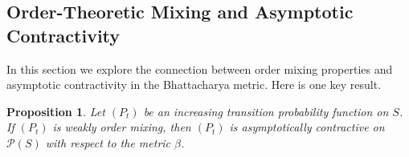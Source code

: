 \documentclass[12pt,reqno]{amsart}
\numberwithin{equation}{section}
\newtheorem{proposition}{Proposition}[section]
\theoremstyle{definition}
\newcommand{\1}{\mathbbm{1}}
\newcommand{\PP}{\mathbb P}
\newcommand{\EE}{\mathbb E}
\newcommand{\pP}{\mathscr{P}}
\begin{document}
%

\subsection{Order-Theoretic Mixing and Asymptotic Contractivity}

In this section we explore the connection between order mixing 
properties and asymptotic contractivity in the Bhattacharya metric.
Here is one key result.

\begin{proposition}\label{p:orwomnew}
    Let $(P_t)$ be an increasing transition probability function on $S$.
    If $(P_t)$ is weakly order mixing, then $(P_t)$ is
    asymptotically contractive on $\pP(S)$ with respect to the metric $\beta$.
\end{proposition}
\end{document}
